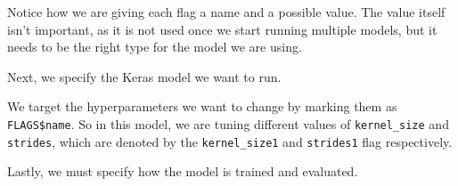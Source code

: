 \documentclass[
]{krantz}
\makeatletter
\newenvironment{Shaded}{\begin{snugshade}}{\end{snugshade}}
\newcommand{\AttributeTok}[1]{\textcolor[rgb]{0.77,0.63,0.00}{#1}}
\newcommand{\DecValTok}[1]{\textcolor[rgb]{0.00,0.00,0.81}{#1}}
\newcommand{\FunctionTok}[1]{\textcolor[rgb]{0.00,0.00,0.00}{#1}}
\newcommand{\NormalTok}[1]{#1}
\newcommand{\OtherTok}[1]{\textcolor[rgb]{0.56,0.35,0.01}{#1}}
\newcommand{\SpecialCharTok}[1]{\textcolor[rgb]{0.00,0.00,0.00}{#1}}
\newcommand{\StringTok}[1]{\textcolor[rgb]{0.31,0.60,0.02}{#1}}
\newenvironment{kframe}{%
\medskip{}
\setlength{\fboxsep}{.8em}
 \def\at@end@of@kframe{}%
 \ifinner\ifhmode%
  \def\at@end@of@kframe{\end{minipage}}%
  \begin{minipage}{\columnwidth}%
 \fi\fi%
 \def\FrameCommand##1{\hskip\@totalleftmargin \hskip-\fboxsep
 \colorbox{shadecolor}{##1}\hskip-\fboxsep
     \hskip-\linewidth \hskip-\@totalleftmargin \hskip\columnwidth}%
 \MakeFramed {\advance\hsize-\width
   \@totalleftmargin\z@ \linewidth\hsize
   \@setminipage}}%
 {\par\unskip\endMakeFramed%
 \at@end@of@kframe}
\renewenvironment{Shaded}{\begin{kframe}}{\end{kframe}}
\makeatother
\begin{document}
Notice how we are giving each flag a name and a possible value. The value itself isn't important, as it is not used once we start running multiple models, but it needs to be the right type for the model we are using.

Next, we specify the Keras model we want to run.

\begin{Shaded}
\end{Shaded}

We target the hyperparameters we want to change by marking them as \texttt{FLAGS\$name}. So in this model, we are tuning different values of \texttt{kernel\_size} and \texttt{strides}, which are denoted by the \texttt{kernel\_size1} and \texttt{strides1} flag respectively.

Lastly, we must specify how the model is trained and evaluated.
\end{document}
